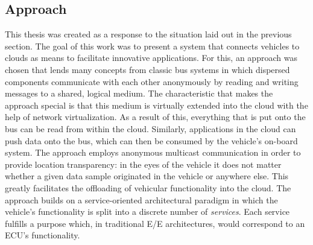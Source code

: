 \subsection{Approach}
This thesis was created as a response to the situation laid out in the previous section. The goal of this work was to present a system that connects vehicles to clouds as means to facilitate innovative applications. For this, an approach was chosen that lends many concepts from classic bus systems in which dispersed components communicate with each other anonymously by reading and writing messages to a shared, logical medium. The characteristic that makes the approach special is that this medium is virtually extended into the cloud with the help of network virtualization. As a result of this, everything that is put onto the bus can be read from within the cloud. Similarly, applications in the cloud can push data onto the bus, which can then be consumed by the vehicle's on-board system. The approach employs anonymous multicast communication in order to provide location transparency: in the eyes of the vehicle it does not matter whether a given data sample originated in the vehicle or anywhere else. This greatly facilitates the offloading of vehicular functionality into the cloud. The approach builds on a service-oriented architectural paradigm in which the vehicle's functionality is split into a discrete number of \emph{services}. Each service fulfills a purpose which, in traditional E/E architectures, would correspond to an ECU's functionality.


